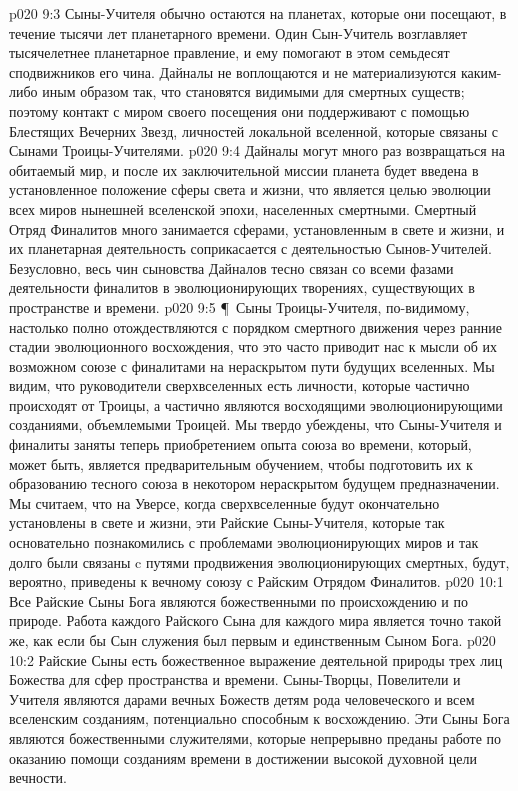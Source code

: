\vs p020 9:3 Сыны\hyp{}Учителя обычно остаются на планетах, которые они посещают, в течение тысячи лет планетарного времени. Один Сын\hyp{}Учитель возглавляет тысячелетнее планетарное правление, и ему помогают в этом семьдесят сподвижников его чина. Дайналы не воплощаются и не материализуются каким\hyp{}либо иным образом так, что становятся видимыми для смертных существ; поэтому контакт с миром своего посещения они поддерживают с помощью Блестящих Вечерних Звезд, личностей локальной вселенной, которые связаны с Сынами Троицы\hyp{}Учителями.
\vs p020 9:4 Дайналы могут много раз возвращаться на обитаемый мир, и после их заключительной миссии планета будет введена в установленное положение сферы света и жизни, что является целью эволюции всех миров нынешней вселенской эпохи, населенных смертными. Смертный Отряд Финалитов много занимается сферами, установленным в свете и жизни, и их планетарная деятельность соприкасается с деятельностью Сынов\hyp{}Учителей. Безусловно, весь чин сыновства Дайналов тесно связан со всеми фазами деятельности финалитов в эволюционирующих творениях, существующих в пространстве и времени.
\vs p020 9:5 \P\ Сыны Троицы\hyp{}Учителя, по\hyp{}видимому, настолько полно отождествляются с порядком смертного движения через ранние стадии эволюционного восхождения, что это часто приводит нас к мысли об их возможном союзе с финалитами на нераскрытом пути будущих вселенных. Мы видим, что руководители сверхвселенных есть личности, которые частично происходят от Троицы, а частично являются восходящими эволюционирующими созданиями, объемлемыми Троицей. Мы твердо убеждены, что Сыны\hyp{}Учителя и финалиты заняты теперь приобретением опыта союза во времени, который, может быть, является предварительным обучением, чтобы подготовить их к образованию тесного союза в некотором нераскрытом будущем предназначении. Мы считаем, что на Уверсе, когда сверхвселенные будут окончательно установлены в свете и жизни, эти Райские Сыны\hyp{}Учителя, которые так основательно познакомились с проблемами эволюционирующих миров и так долго были связаны c путями продвижения эволюционирующих смертных, будут, вероятно, приведены к вечному союзу с Райским Отрядом Финалитов.
\vs p020 10:1 Все Райские Сыны Бога являются божественными по происхождению и по природе. Работа каждого Райского Сына для каждого мира является точно такой же, как если бы Сын служения был первым и единственным Сыном Бога.
\vs p020 10:2 Райские Сыны есть божественное выражение деятельной природы трех лиц Божества для сфер пространства и времени. Сыны\hyp{}Творцы, Повелители и Учителя являются дарами вечных Божеств детям рода человеческого и всем вселенским созданиям, потенциально способным к восхождению. Эти Сыны Бога являются божественными служителями, которые непрерывно преданы работе по оказанию помощи созданиям времени в достижении высокой духовной цели вечности.
